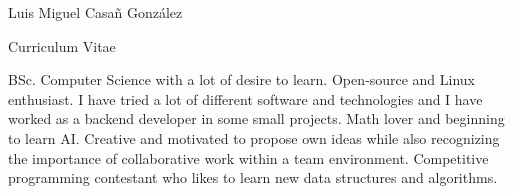 \documentclass[10pt]{curriculum}
\begin{document}
\begin{center}
	{\sffamily\Huge Luis Miguel Casañ González}
	
	\medskip
	
	{\Huge{Curriculum Vitae}}
\end{center}

BSc. Computer Science with a lot of desire to learn. Open‑source and Linux enthusiast. I have tried a
lot of different software and technologies and I have worked as a backend developer in some small projects. Math lover and beginning to learn AI. Creative and motivated to propose own ideas while also recognizing the importance of collaborative work within a team environment. Competitive programming contestant who likes to learn new data structures and algorithms.
\begin{paracol}{2} %


%	
%	
%	
%	







\end{paracol}
\end{document}
